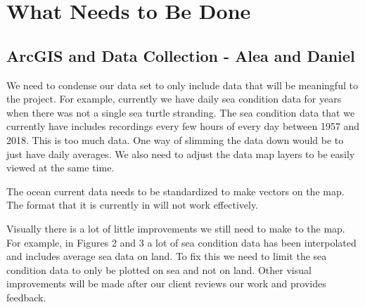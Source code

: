 \documentclass[onecolumn, draftclsnofoot,10pt, compsoc]{IEEEtran}
\begin{document}
\section{What Needs to Be Done}

\subsection{ArcGIS and Data Collection - Alea and Daniel} 
\par We need to condense our data set to only include data that will be meaningful to the project. For example, currently we have daily sea condition data for years when there was not a single sea turtle stranding. The sea condition data that we currently have includes recordings every few hours of every day between 1957 and 2018. This is too much data. One way of slimming the data down would be to just have daily averages.  We also need to adjust the data map layers to be easily viewed at the same time.
\par The ocean current data needs to be standardized to make vectors on the map.  The format that it is currently in will not work effectively.

\par Visually there is a lot of little improvements we still need to make to the map. For example, in Figures 2 and 3 a lot of sea condition data has been interpolated and includes average sea data on land. To fix this we need to limit the sea condition data to only be plotted on sea and not on land. Other visual improvements will be made after our client reviews our work and provides feedback. 
\end{document}
